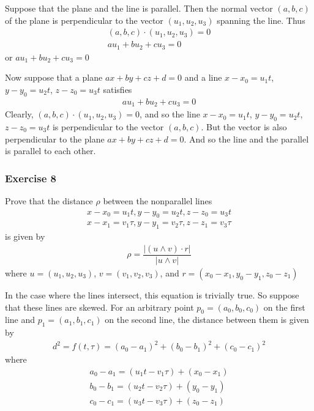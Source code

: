 \documentclass{article}
\begin{document}
	Suppose that the plane and the line is parallel. Then the normal vector $(a, b, c)$ of the plane is perpendicular to the vector $(u_1, u_2, u_3)$ spanning the line. Thus
	\begin{gather*}
		(a, b, c) \cdot (u_1, u_2, u_3) = 0 \\
		au_1 + bu_2 + cu_3 = 0
	\end{gather*}
	or $au_1 + bu_2 + cu_3 = 0$
	
	Now suppose that a plane $ax + by + cz + d = 0$ and a line $x - x_0 = u_1t$, $y - y_0 = u_2t$, $z - z_0 = u_3t$ satisfies
	\begin{gather*}
		au_1 + bu_2 + cu_3 = 0
	\end{gather*}
	Clearly, $(a, b, c) \cdot (u_1, u_2, u_3) = 0$, and so the line $x - x_0 = u_1t$, $y - y_0 = u_2t$, $z - z_0 = u_3t$ is perpendicular to the vector $(a, b, c)$. But the vector is also perpendicular to the plane $ax + by + cz + d = 0$. And so the line and the parallel is parallel to each other.
	
	\subsubsection*{Exercise 8}
	Prove that the distance $\rho$ between the nonparallel lines
	\begin{gather*}
		x - x_0 = u_1t, y - y_0 = u_2t, z - z_0 = u_3t \\
		x - x_1 = v_1\tau, y - y_1 = v_2\tau, z - z_1 = v_3\tau
	\end{gather*}
	is given by
	\begin{gather*}
		\rho = \dfrac{|(u \wedge v) \cdot r|}{|u \wedge v|}
	\end{gather*}
	where $u = (u_1, u_2, u_3)$, $v = (v_1, v_2, v_3)$, and $r = (x_0 - x_1, y_0 - y_1, z_0 - z_1)$
	
	In the case where the lines intersect, this equation is trivially true. So suppose that these lines are skewed. For an arbitrary point $p_0 = (a_0, b_0, c_0)$ on the first line and $p_1 = (a_1, b_1, c_1)$ on the second line, the distance between them is given by
	\begin{gather*}
		d^2 = f(t, \tau) = (a_0 - a_1)^2 + (b_0 - b_1)^2 + (c_0 - c_1)^2
	\end{gather*}
	where
	\begin{gather*}
		a_0 - a_1 = (u_1t - v_1\tau) + (x_0 - x_1) \\
		b_0 - b_1 = (u_2t - v_2\tau) + (y_0 - y_1) \\
		c_0 - c_1 = (u_3t - v_3\tau) + (z_0 - z_1)
	\end{gather*}
	
\end{document}
